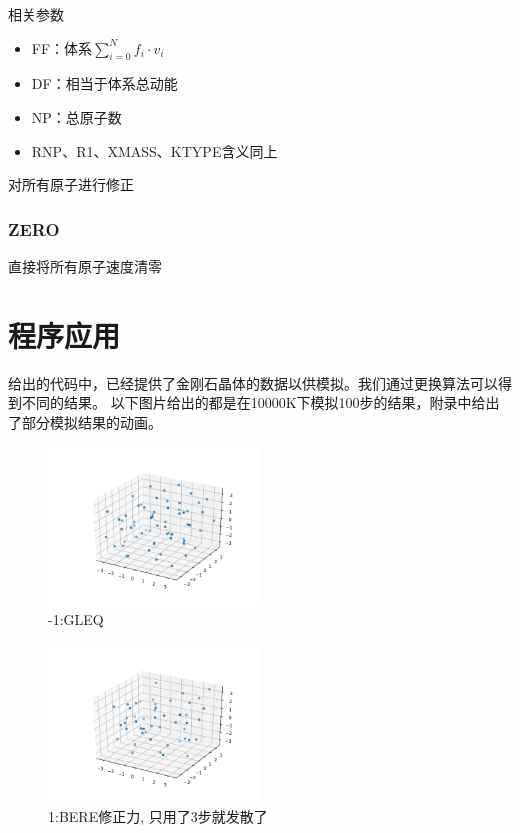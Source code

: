 \documentclass{ctexart}
\begin{document}
\noindent
相关参数

\begin{itemize}
    \item FF：体系$\sum^N_{i=0}f_i\cdot v_i$
    \item DF：相当于体系总动能
    \item NP：总原子数
    \item RNP、R1、XMASS、KTYPE含义同上
\end{itemize}

对所有原子进行修正

\subsubsection{ZERO}

直接将所有原子速度清零

\section{程序应用}
给出的代码中，已经提供了金刚石晶体的数据以供模拟。我们通过更换算法可以得到不同的结果。
以下图片给出的都是在10000K下模拟100步的结果，附录中给出了部分模拟结果的动画。
\begin{figure}[!htbp]
    \centering
    \includegraphics[width=0.5\textwidth]{fig/sim-1.png}
    \caption{-1:GLEQ}
\end{figure}
\begin{figure}[!htbp]
    \centering
    \includegraphics[width=0.5\textwidth]{fig/sim1.png}
    \caption{1:BERE修正力, 只用了3步就发散了}
\end{figure}
\end{document}
